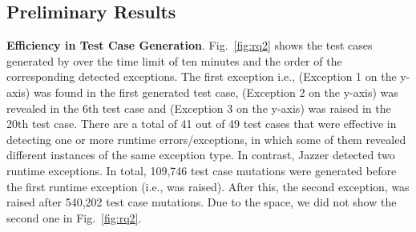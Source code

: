 

\subsection{Preliminary Results}

{\bf Efficiency in Test Case Generation}. Fig.~\ref{fig:rq2} shows the
test cases generated by {\tool} over the time limit of ten minutes and
the order of the corresponding detected exceptions. The first
exception i.e.,  (Exception 1 on the
y-axis) was found in the first generated test case,
 (Exception 2 on the y-axis) was revealed
in the 6th test case and
 (Exception 3 on the
y-axis) was raised in the 20th test case. There are a total of 41 out
of 49 test cases that were effective in detecting one or more runtime
errors/exceptions, in which some of them revealed different instances
of the same exception type.
%
In contrast, Jazzer detected two runtime exceptions. In total, 109,746
test case mutations were generated before the first runtime exception
(i.e.,  was
raised). After this, the second exception,
 was raised after 540,202 test case
mutations. Due to the space, we did not show the second one in
Fig.~\ref{fig:rq2}.



